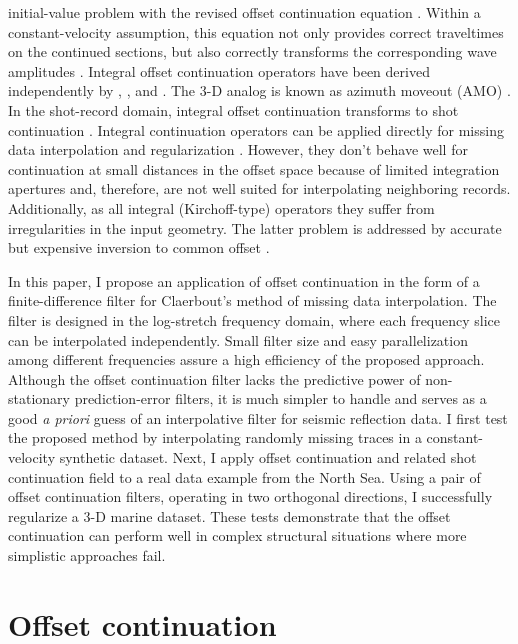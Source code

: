 initial-value problem with the revised offset continuation equation
\cite{ofcon1}. Within a constant-velocity assumption, this equation
not only provides correct traveltimes on the continued sections, but
also correctly transforms the corresponding wave amplitudes
\cite{SEG-1996-1731}. Integral offset continuation operators have been
derived independently by ,
, and .  The 3-D analog
is known as azimuth moveout (AMO) \cite{GEO63-02-05740588}. In the
shot-record domain, integral offset continuation transforms to shot
continuation \cite{Schwab.sep.77.117,SEG-1993-0673,SEG-1996-0439}.
Integral continuation operators can be applied directly for missing
data interpolation and regularization
\cite{SEG-1994-1549,SEG-1999-19951998}. However, they don't behave
well for continuation at small distances in the offset space because
of limited integration apertures and, therefore, are not well suited
for interpolating neighboring records. Additionally, as all integral
(Kirchoff-type) operators they suffer from irregularities in the input
geometry. The latter problem is addressed by accurate but expensive
inversion to common offset \cite{Chemingui.sepphd.101}.
\par
In this paper, I propose an application of offset continuation in the
form of a finite-difference filter for Claerbout's method of missing
data interpolation.  The filter is designed in the log-stretch
frequency domain, where each frequency slice can be interpolated
independently.  Small filter size and easy parallelization among
different frequencies assure a high efficiency of the proposed
approach. Although the offset continuation filter lacks the predictive
power of non-stationary prediction-error filters, it is much simpler
to handle and serves as a good \emph{a priori} guess of an
interpolative filter for seismic reflection data. I first test the
proposed method by interpolating randomly missing traces in a
constant-velocity synthetic dataset. Next, I apply offset continuation
and related shot continuation field to a real data example from the
North Sea. Using a pair of offset continuation filters, operating in
two orthogonal directions, I successfully regularize a 3-D marine
dataset. These tests demonstrate that the offset continuation can
perform well in complex structural situations where more simplistic
approaches fail.

\section{Offset continuation}

